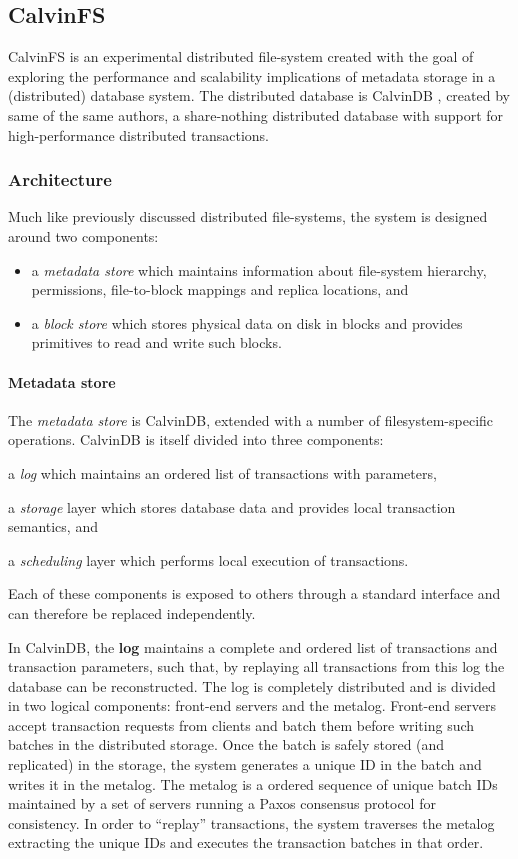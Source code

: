 \subsection{CalvinFS}
CalvinFS \cite{DBLP:conf/fast/ThomsonA15} is an experimental distributed file-system created with the goal of exploring the performance and scalability implications of metadata storage in a (distributed) database system.
The distributed database is CalvinDB \cite{DBLP:conf/sigmod/ThomsonDWRSA12}, created by same of the same authors, a share-nothing distributed database with support for high-performance distributed transactions.

\subsubsection{Architecture}
Much like previously discussed distributed file-systems, the system is designed around two components:
\begin{itemize}
    \item a \emph{metadata store} which maintains information about file-system hierarchy, permissions, file-to-block mappings and replica locations, and
    \item a \emph{block store} which stores physical data on disk in blocks and provides primitives to read and write such blocks.
\end{itemize}

\paragraph{Metadata store} The \emph{metadata store} is CalvinDB, extended with a number of filesystem-specific operations.
CalvinDB is itself divided into three components: \begin{inparaenum}[i)]
    \item a \emph{log} which maintains an ordered list of transactions with parameters,
    \item a \emph{storage} layer which stores database data and provides local transaction semantics, and
    \item a \emph{scheduling} layer which performs local execution of transactions.
\end{inparaenum}
Each of these components is exposed to others through a standard interface and can therefore be replaced independently.

In CalvinDB, the \textbf{log} maintains a complete and ordered list of transactions and transaction parameters, such that, by replaying all transactions from this log the database can be reconstructed.
The log is completely distributed and is divided in two logical components: front-end servers and the metalog.
Front-end servers accept transaction requests from clients and batch them before writing such batches in the distributed storage.
Once the batch is safely stored (and replicated) in the storage, the system generates a unique ID in the batch and writes it in the metalog.
The metalog is a ordered sequence of unique batch IDs maintained by a set of servers running a Paxos consensus protocol for consistency.
In order to ``replay'' transactions, the system traverses the metalog extracting the unique IDs and executes the transaction batches in that order.


